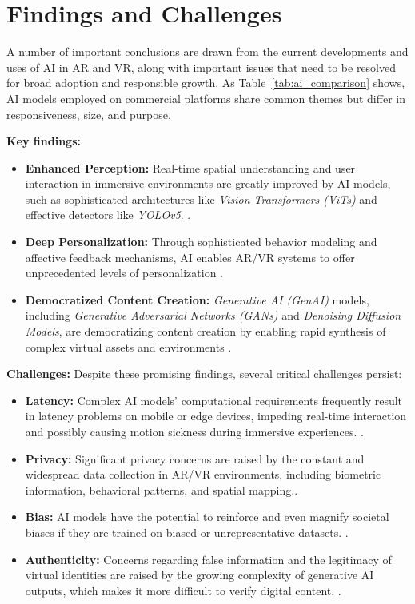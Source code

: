 \documentclass[conference]{IEEEtran}
\begin{document}
 \newline\section{Findings and Challenges}
A number of important conclusions are drawn from the current developments and uses of AI in AR and VR, along with important issues that need to be resolved for broad adoption and responsible growth. As Table~\ref{tab:ai_comparison} shows, AI models employed on commercial platforms share common themes but differ in responsiveness, size, and purpose.

\textbf{Key findings:}
\begin{itemize}
    \item \textbf{Enhanced Perception:} Real-time spatial understanding and user interaction in immersive environments are greatly improved by AI models, such as sophisticated architectures like \textit{Vision Transformers (ViTs)} and effective detectors like \textit{YOLOv5}. \cite{Khan2021ViT, Almeida2021YOLO}.
    \item \textbf{Deep Personalization:} Through sophisticated behavior modeling and affective feedback mechanisms, AI enables AR/VR systems to offer unprecedented levels of personalization \cite{Johnson2020AdaptiveLearning, Johnson2024Personalization}.
    \item \textbf{Democratized Content Creation:} \textit{Generative AI (GenAI)} models, including \textit{Generative Adversarial Networks (GANs)} and \textit{Denoising Diffusion Models}, are democratizing content creation by enabling rapid synthesis of complex virtual assets and environments \cite{Behravan2024GenAI, Johnson2024GANs, Seo2025Diffusion}.
\end{itemize}

\textbf{Challenges:}
Despite these promising findings, several critical challenges persist:
\begin{itemize}
    \item \textbf{Latency:} Complex AI models' computational requirements frequently result in latency problems on mobile or edge devices, impeding real-time interaction and possibly causing motion sickness during immersive experiences. \cite{Khan2024ARVR}.
    \item \textbf{Privacy:} Significant privacy concerns are raised by the constant and widespread data collection in AR/VR environments, including biometric information, behavioral patterns, and spatial mapping.\cite{Johnson2024PrivacyReview, Johnson2024PrivacySurvey}.
    \item \textbf{Bias:} AI models have the potential to reinforce and even magnify societal biases if they are trained on biased or unrepresentative datasets. \cite{Johnson2025AlgorithmicFairness}.
    \item \textbf{Authenticity:} Concerns regarding false information and the legitimacy of virtual identities are raised by the growing complexity of generative AI outputs, which makes it more difficult to verify digital content. \cite{Johnson2025AIauthenticity}.
\end{itemize}
\end{document}

